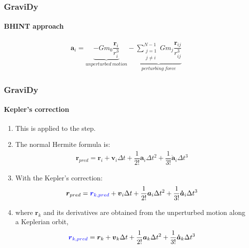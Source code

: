 \begin{frame}[fragile]
    \frametitle{GraviDy}
    \framesubtitle{BHINT approach}
    \begin{eqnarray}
        \boldsymbol{a}_{i} =   \underbrace{ - G m_{0}
                                          \dfrac{\boldsymbol{r}_{i}}{r_{i}^{3}}
                                          }_{unperturbed\ motion}
                             - \underbrace{ \sum\limits_{\substack{j=1\\j\neq i}}^{N-1}
                                            G m_{j} \dfrac{\boldsymbol{r}_{ij}}{r_{ij}^{3}}
                                          }_{perturbing\ force}
    \end{eqnarray}
\end{frame}

\begin{frame}
    \frametitle{GraviDy}
    \framesubtitle{Kepler's correction}
    \begin{enumerate}
        \item This is applied to the  step.
        \item The normal Hermite formula is:
        \begin{eqnarray}
            \boldsymbol{r}_{pred} =    \boldsymbol{      r}_{i}              +
                                       \boldsymbol{      v}_{i} \Delta t     +
                         \dfrac{1}{2!} \boldsymbol{      a}_{i} \Delta t^{2} +
                         \dfrac{1}{3!} \boldsymbol{\dot{a}}_{i} \Delta t^{3}
        \end{eqnarray}
        \item With the Kepler's correction:
        \begin{eqnarray}
            \boldsymbol{r}_{pred} =    \textcolor{blue}{\boldsymbol{      r}_{k,pred}}         +
                                             \boldsymbol{      v}_{i} \Delta t     +
                         \dfrac{1}{2!}       \boldsymbol{      a}_{i} \Delta t^{2} +
                         \dfrac{1}{3!}       \boldsymbol{\dot{a}}_{i} \Delta t^{3}
        \end{eqnarray}
        \item where $\boldsymbol{r}_{k}$ and its derivatives 
            are obtained from the unperturbed motion along a Keplerian orbit,
        \begin{eqnarray}
            \textcolor{blue}{\boldsymbol{r}_{k,pred}} =  \boldsymbol{      r}_{k}              +
                                       \boldsymbol{      v}_{k} \Delta t     +
                         \dfrac{1}{2!} \boldsymbol{      a}_{k} \Delta t^{2} +
                         \dfrac{1}{3!} \boldsymbol{\dot{a}}_{k} \Delta t^{3}
        \end{eqnarray}

    \end{enumerate}
\end{frame}

